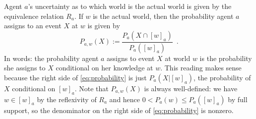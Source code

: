 \documentclass[12pt]{article}
\theoremstyle{definition}
\begin{document}
Agent $a$'s uncertainty as to which world is the actual world
is given by the equivalence relation $R_a$. 
If $w$ is the actual world, then the probability agent
$a$ assigns to an event $X$ at $w$ is given by
\begin{equation}
  P_{a,w}(X) := \frac{P_a(X\cap[w]_a)}{P_a([w]_a)}\enspace.
  \label{eq:probability}
\end{equation}
In words: the probability agent $a$ assigns to event $X$ at
world $w$ is the probability she assigns to $X$ conditional
on her knowledge at $w$.  This
reading makes sense because the right side of \eqref{eq:probability}
is just $P_a(X|[w]_a)$, the probability of $X$ conditional on
$[w]_a$.  Note that $P_{a,w}(X)$ is always well-defined:
we have $w\in[w]_a$ by the reflexivity of
$R_a$ and hence
$0<P_a(w)\leq P_a([w]_a)$ by full support, so the denominator on the right side of 
\eqref{eq:probability} is nonzero.
\end{document}
